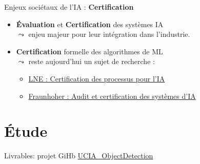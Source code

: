 \documentclass[11pt,serif,mathserif,compress,hyperref={colorlinks}]{beamer}
\begin{document}
\begin{frame}{Enjeux sociétaux de l'IA : {\bf Certification}}
  
  \begin{tcolorbox}[title={\bf Certification}]
    \begin{itemize}
    \item<1-> {\bf Évaluation} et {\bf Certification} des systèmes IA\\
      $\leadsto$ enjeu majeur pour leur intégration dans l'industrie. \medskip
    \item<2-> {\bf Certification} formelle des algorithmes de ML\\
      $\leadsto$ reste aujourd'hui un sujet de recherche :
      \begin{itemize}
      \item \href{https://www.lne.fr/fr/service/certification/certification-processus-ia}{LNE : Certification des processus pour l'IA}
      \item \href{https://www.hhi.fraunhofer.de/en/departments/ai/technologies-and-solutions/auditing-and-certification-of-ai-systems.html}
           {Fraunhoher : Audit et certification des systèmes d'IA}
      \end{itemize}
    \end{itemize}
  \end{tcolorbox}
    
\end{frame}

\section{Étude}

\begin{frame}{}

  \vfill
  \vfill
  Livrables: projet GiHb \href{https://github.com/cjlux/UCIA_ObjectDetection/tree/master}{UCIA\_ObjectDetection}
  \vfill

\end{frame}
\end{document}
